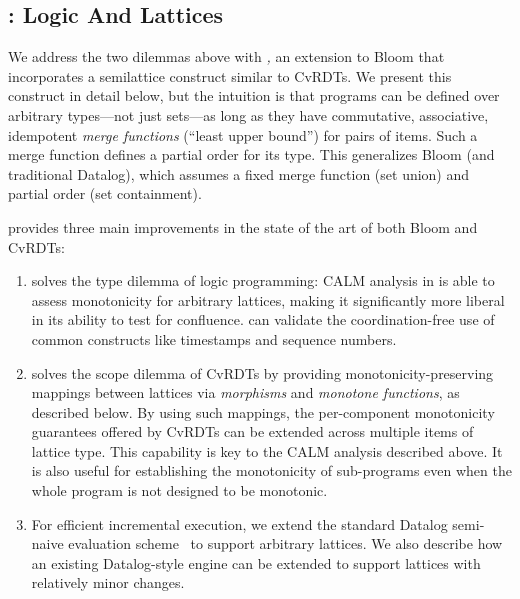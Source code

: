 \subsection{\lang: Logic And Lattices}
We address the two dilemmas above with \emph{\lang,} an extension to Bloom that
incorporates a semilattice construct similar to CvRDTs.  We present this construct in detail below, but the intuition is that \lang programs can be defined over arbitrary types---not just sets---as long as they have commutative, associative, idempotent \emph{merge functions} (``least upper bound'') for pairs of items.  Such a merge function defines a partial order  for its type. This
generalizes Bloom (and traditional Datalog), which assumes a fixed merge
function (set union) and partial order (set containment).


\lang provides three main improvements in the state of the art of both Bloom and CvRDTs:  
\begin{enumerate}
\item \lang solves the type dilemma of logic programming: CALM analysis in \lang is able to 
 assess monotonicity for arbitrary lattices, making it significantly more liberal in its ability to test for confluence.  \lang can validate the coordination-free use of
  common constructs like timestamps and sequence numbers.

\item {\lang} solves the scope dilemma of CvRDTs by providing monotonicity-preserving mappings between lattices via
  \emph{morphisms} and \emph{monotone functions}, as described below.  By using such mappings, the
  per-component monotonicity guarantees offered by CvRDTs can be extended across
  multiple items of lattice type.  This capability is key to the CALM
  analysis described above.  It is also useful for
  establishing the monotonicity of sub-programs even when the whole program is
  not designed to be monotonic.

\item For efficient incremental execution, we extend the standard Datalog semi-naive
  evaluation scheme~\cite{Balbin1987} to support arbitrary lattices. We also describe how an existing Datalog-style engine can be
  extended to support lattices with relatively minor changes.
\end{enumerate}


